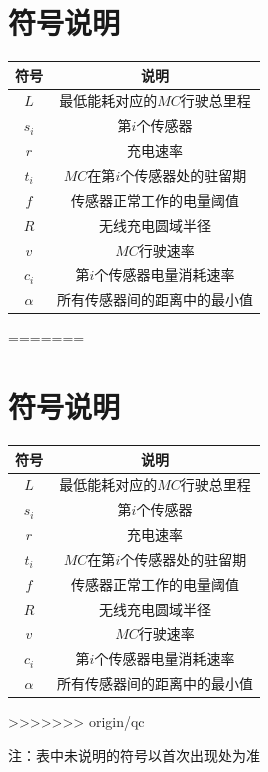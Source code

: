\documentclass{whutmod}
\begin{document}
\section{符号说明}
\begin{table}[H]
	\centering
	\setlength{\tabcolsep}{12mm}
	\begin{tabular}{cc}
		\toprule[1.5pt]
		\multicolumn{1}{m{5cm}}{\centering 符号} & \multicolumn{1}{m{5cm}}{\centering 说明} \\
		\midrule[1pt]		
		$L$  & 最低能耗对应的$MC$行驶总里程  \\ 
		$s_i$  & 第$i$个传感器  \\ 
		$r$  & 充电速率  \\ 
		$t_i$  & $MC$在第$i$个传感器处的驻留期  \\ 
		$f$  & 传感器正常工作的电量阈值  \\ 
		$R$  & 无线充电圆域半径  \\ 
		$v$  & $MC$行驶速率  \\ 
		$c_i$  & 第$i$个传感器电量消耗速率  \\ 
		$\alpha$  & 所有传感器间的距离中的最小值  \\ 
		\bottomrule[1.5pt]
	\end{tabular}
	\begin{tablenotes}
=======
	\section{符号说明}
		\begin{table}[H]
		\centering
		\setlength{\tabcolsep}{12mm}
		\begin{tabular}{cc}
			\toprule[1.5pt]
			\multicolumn{1}{m{5cm}}{\centering 符号} & \multicolumn{1}{m{5cm}}{\centering 说明} \\
			\midrule[1pt]		
			$L$  & 最低能耗对应的$MC$行驶总里程  \\ 
			$s_i$  & 第$i$个传感器  \\ 
		   	$r$  & 充电速率  \\ 
		   	$t_i$  & $MC$在第$i$个传感器处的驻留期  \\ 
		   	$f$  & 传感器正常工作的电量阈值  \\ 
		   	$R$  & 无线充电圆域半径  \\ 
		   	$v$  & $MC$行驶速率  \\ 
		   	$c_i$  & 第$i$个传感器电量消耗速率  \\ 
		   	$\alpha$  & 所有传感器间的距离中的最小值  \\ 
			\bottomrule[1.5pt]
		\end{tabular}
		\begin{tablenotes}
>>>>>>> origin/qc
		\item 注：表中未说明的符号以首次出现处为准
	\end{tablenotes}
\end{table}


\end{tablenotes}
\end{table}
\end{document}
